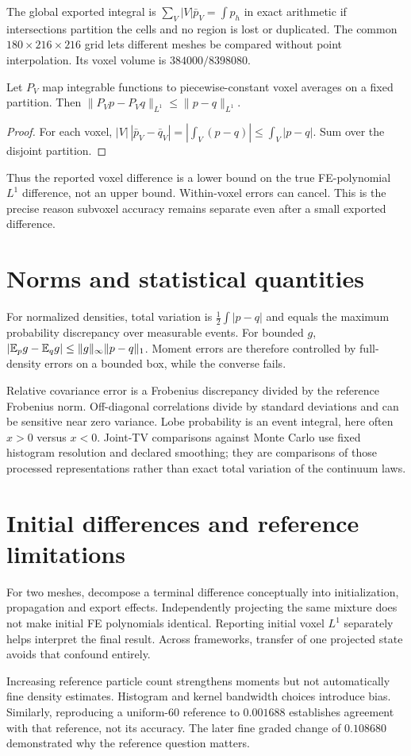 The global exported integral is $\sum_V|V|\bar p_V=\int p_h$ in exact arithmetic if intersections partition the cells and no region is lost or duplicated. The common $180\times216\times216$ grid lets different meshes be compared without point interpolation. Its voxel volume is $384000/8398080$.

\begin{proposition}\label{prop:export}
Let $P_V$ map integrable functions to piecewise-constant voxel averages on a fixed partition. Then $\|P_Vp-P_Vq\|_{L^1}\le\|p-q\|_{L^1}$.
\end{proposition}
\begin{proof}
For each voxel, $|V|\,|\bar p_V-\bar q_V|=|\int_V(p-q)|\le\int_V|p-q|$. Sum over the disjoint partition.
\end{proof}
Thus the reported voxel difference is a lower bound on the true FE-polynomial $L^1$ difference, not an upper bound. Within-voxel errors can cancel. This is the precise reason subvoxel accuracy remains separate even after a small exported difference.

\section{Norms and statistical quantities}
For normalized densities, total variation is $\frac12\int|p-q|$ and equals the maximum probability discrepancy over measurable events. For bounded $g$, $|\mathbb E_pg-\mathbb E_qg|\le\|g\|_\infty\|p-q\|_1$. Moment errors are therefore controlled by full-density errors on a bounded box, while the converse fails.

Relative covariance error is a Frobenius discrepancy divided by the reference Frobenius norm. Off-diagonal correlations divide by standard deviations and can be sensitive near zero variance. Lobe probability is an event integral, here often $x>0$ versus $x<0$. Joint-TV comparisons against Monte Carlo use fixed histogram resolution and declared smoothing; they are comparisons of those processed representations rather than exact total variation of the continuum laws.

\section{Initial differences and reference limitations}
For two meshes, decompose a terminal difference conceptually into initialization, propagation and export effects. Independently projecting the same mixture does not make initial FE polynomials identical. Reporting initial voxel $L^1$ separately helps interpret the final result. Across frameworks, transfer of one projected state avoids that confound entirely.

Increasing reference particle count strengthens moments but not automatically fine density estimates. Histogram and kernel bandwidth choices introduce bias. Similarly, reproducing a uniform-$60$ reference to $0.001688$ establishes agreement with that reference, not its accuracy. The later fine graded change of $0.108680$ demonstrated why the reference question matters.
